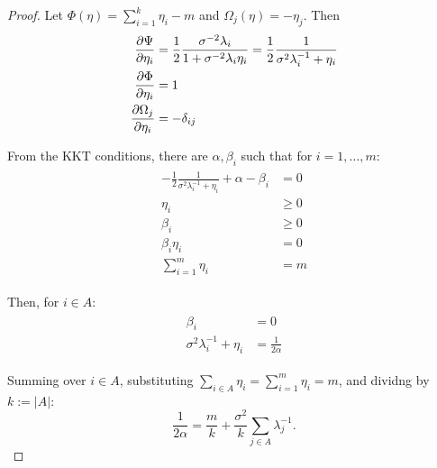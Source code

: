 \begin{proof}
  Let $\Phi(\eta) = \sum_{i=1}^k \eta_i - m$ and $\Omega_j(\eta) =
   -\eta_j$. Then
  \begin{align*}
    \begin{split}
      \frac{\partial \tar}{\partial \eta_i}  &=
       \frac12 \frac{\sigma^{-2}\lambda_i}{1 + \sigma^{-2} \lambda_i\eta_i} = \frac12 \frac{1}{\sigma^{2}\lambda_i^{-1} + \eta_i} \\
      \frac{\partial\Phi}{\partial \eta_i} &= 1 \\
      \frac{\partial \Omega_j}{\partial \eta_i} &= -\delta_{ij}      
    \end{split}
  \end{align*}

  From the KKT conditions, there are $\alpha, \beta_i$ such that for $i=1,\dots,m$:
  \begin{align}
    \begin{split}
      -\frac12 \frac{1}{\sigma^{2}\lambda_i^{-1} + \eta_i} + \alpha - \beta_i  &= 0 \\
      \eta_i &\geq 0\\
      \beta_i &\geq 0\\
      \beta_i \eta_i &= 0\\
      \sum_{i=1}^m \eta_i &= m 
    \end{split}
  \end{align}

  Then, for $i \in A$:
  \begin{align*}
    \begin{split}
      \beta_i &= 0\\
      \sigma^{2}\lambda_i^{-1} + \eta_i  &= \frac{1}{2\alpha}%
    \end{split}
  \end{align*}
  
  Summing over $i \in A$, substituting $\sum_{i\in A} \eta_i =
  \sum_{i=1}^m \eta_i = m$, and dividng by $k:= |A|$:
  $$
  \frac{1}{2\alpha} = \frac{m}{k} + \frac{\sigma^2}{k} \sum_{j\in A} \lambda_j^{-1}.
  $$


\end{proof}
